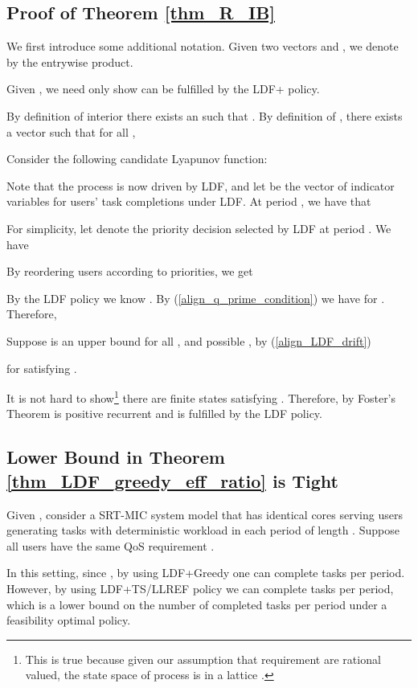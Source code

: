 \documentclass[prodmode,acmtompecs]{acmsmall}
\begin{document}
\subsection{Proof of Theorem \ref{thm_R_IB}}
\label{pf_theorem_R_IB}
We first introduce some additional notation. Given two vectors  and , we denote by  the entrywise product. 

Given , we need only show  can be fulfilled by the LDF+ policy. 

By definition of interior there exists an  such that . 
By definition of , there exists a vector  such that for all , 


Consider the following candidate Lyapunov function: 


Note that the process  is now driven by LDF, and let  be the vector of indicator variables for users' task completions under LDF. 
At period , we have that


For simplicity, let  denote the priority decision selected by LDF at period . We have

By reordering users according to priorities, we get


By the LDF policy we know . By (\ref{align_q_prime_condition}) we have  for . Therefore, 



Suppose  is an upper bound for all ,  and possible , by (\ref{align_LDF_drift})

for  satisfying . 

It is not hard to show\footnote{This is true because given our assumption that requirement  are rational valued, the state space of process  is in a lattice \cite{CoS13b}.} there are finite states  satisfying . Therefore, by Foster's Theorem  is positive recurrent and  is fulfilled by the LDF policy. 

\subsection{Lower Bound in Theorem \ref{thm_LDF_greedy_eff_ratio} is Tight}
\label{appendix_example_showing_theorem_LDF_Greedy_eff_ratio_is_tight}
Given , consider a SRT-MIC system model that has  identical cores serving  users generating tasks with deterministic workload  in each period of length . Suppose all users have the same QoS requirement . 

In this setting, since , by using LDF+Greedy one can complete  tasks per period. However, by using LDF+TS/LLREF policy we can complete  tasks per period, which is a lower bound on the number of completed tasks per period under a feasibility optimal policy. 
\end{document}
